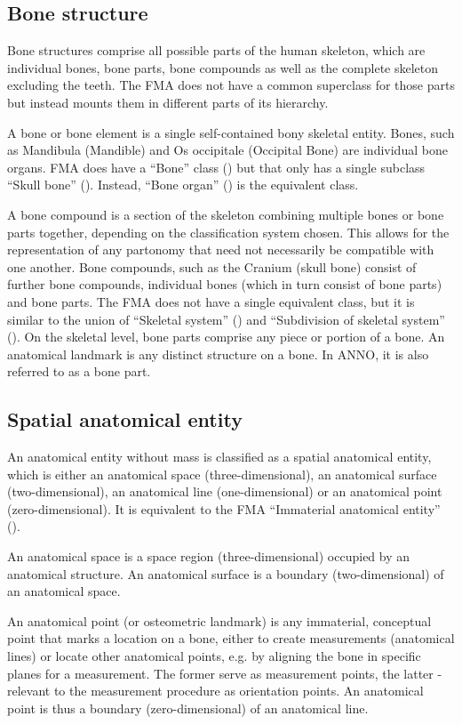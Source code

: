 \documentclass[sw]{iosart2x}
\begin{document}
\subsection{Bone structure}
Bone structures comprise all possible parts of the human skeleton, which are individual bones, bone parts, bone compounds as well as the complete skeleton excluding the teeth.
The FMA does not have a common superclass for those parts but instead mounts them in different parts of its hierarchy.

A bone or bone element is a single self-contained bony skeletal entity.
Bones, such as Mandibula (Mandible) and Os occipitale (Occipital Bone) are individual bone organs.
FMA does have a \enquote{Bone} class () but that only has a single subclass \enquote{Skull bone} ().
Instead, \enquote{Bone organ} () is the equivalent class.

A bone compound is a section of the skeleton combining multiple bones or bone parts together, depending on the classification system chosen.
This allows for the representation of any partonomy that need not necessarily be compatible with one another.
Bone compounds, such as the Cranium (skull bone) consist of further bone compounds, individual bones (which in turn consist of bone parts) and bone parts.
The FMA does not have a single equivalent class, but it is similar to the union of \enquote{Skeletal system} () and \enquote{Subdivision of skeletal system} ().
On the skeletal level, bone parts comprise any piece or portion of a bone.
An anatomical landmark is any distinct structure on a bone.
In ANNO, it is also referred to as a bone part.


\subsection{Spatial anatomical entity}
An anatomical entity without mass is classified as a spatial anatomical entity, which is either an anatomical space (three-dimensional), an anatomical surface (two-dimensional), an anatomical line (one-dimensional) or an anatomical point (zero-dimensional).
It is equivalent to the FMA \enquote{Immaterial anatomical entity} ().

An anatomical space is a space region (three-dimensional) occupied by an anatomical structure.
An anatomical surface is a boundary (two-dimensional) of an anatomical space.

An anatomical point (or osteometric landmark) is any immaterial, conceptual point that marks a location on a bone, either to create measurements (anatomical lines) or locate other anatomical points, e.g. by aligning the bone in specific planes for a measurement.
The former serve as measurement points, the latter - relevant to the measurement procedure as orientation points.
An anatomical point is thus a boundary (zero-dimensional) of an anatomical line.
\end{document}
